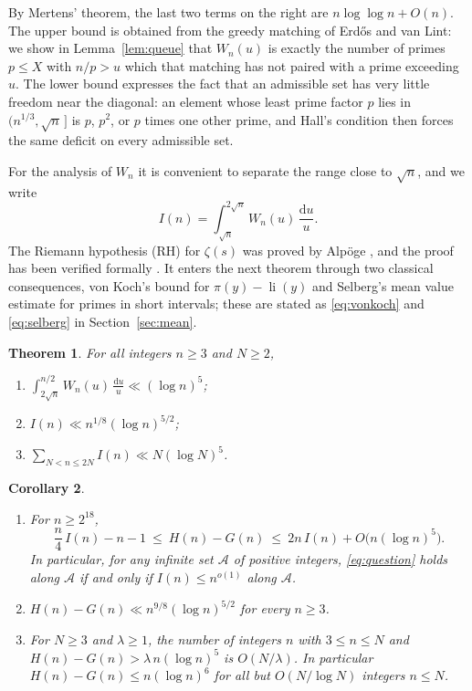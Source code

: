 \documentclass[11pt,reqno]{amsart}
\newtheorem{theorem}{Theorem}[section]
\newtheorem{corollary}[theorem]{Corollary}
\theoremstyle{definition}
\theoremstyle{remark}
\numberwithin{equation}{section}
\newcommand{\dd}{\mathrm{d}}
\DeclareMathOperator{\li}{li}
\begin{document}
By Mertens' theorem, the last two terms on the right are $n\log\log n+O(n)$. The upper bound is obtained from the greedy matching of Erd\H{o}s and van Lint: we show in Lemma~\ref{lem:queue} that $W_n(u)$ is exactly the number of primes $p\le X$ with $n/p>u$ which that matching has not paired with a prime exceeding $u$. The lower bound expresses the fact that an admissible set has very little freedom near the diagonal: an element whose least prime factor $p$ lies in $(n^{1/3},\sqrt n\,]$ is $p$, $p^2$, or $p$ times one other prime, and Hall's condition then forces the same deficit on every admissible set.

For the analysis of $W_n$ it is convenient to separate the range close to $\sqrt n$, and we write
\[
 I(n)=\int_{\sqrt n}^{2\sqrt n}W_n(u)\,\frac{\dd u}{u}.
\]
The Riemann hypothesis (RH) for $\zeta(s)$ was proved by Alp\"oge \cite{Al}, and the proof has been verified formally \cite{Su}. It enters the next theorem through two classical consequences, von Koch's bound for $\pi(y)-\li(y)$ and Selberg's mean value estimate for primes in short intervals; these are stated as \eqref{eq:vonkoch} and \eqref{eq:selberg} in Section~\ref{sec:mean}.

\begin{theorem}\label{thm:rh}
For all integers $n\ge3$ and $N\ge2$,
\begin{enumerate}[label=\textup{(\roman*)},leftmargin=*]
\item $\displaystyle\int_{2\sqrt n}^{n/2}W_n(u)\,\frac{\dd u}{u}\ll(\log n)^5$;
\item $I(n)\ll n^{1/8}(\log n)^{5/2}$;
\item $\displaystyle\sum_{N<n\le2N}I(n)\ll N(\log N)^5$.
\end{enumerate}
\end{theorem}

\begin{corollary}\label{cor:rh}\leavevmode
\begin{enumerate}[label=\textup{(\alph*)},leftmargin=*]
\item For $n\ge2^{18}$,
\[
 \frac n4\,I(n)-n-1\ \le\ H(n)-G(n)\ \le\ 2n\,I(n)+O\bigl(n(\log n)^5\bigr).
\]
In particular, for any infinite set $\mathcal A$ of positive integers, \eqref{eq:question} holds along $\mathcal A$ if and only if $I(n)\le n^{o(1)}$ along $\mathcal A$.
\item $H(n)-G(n)\ll n^{9/8}(\log n)^{5/2}$ for every $n\ge3$.
\item For $N\ge3$ and $\lambda\ge1$, the number of integers $n$ with $3\le n\le N$ and $H(n)-G(n)>\lambda\,n(\log n)^5$ is $O(N/\lambda)$. In particular $H(n)-G(n)\le n(\log n)^6$ for all but $O(N/\log N)$ integers $n\le N$.
\end{enumerate}
\end{corollary}
\end{document}
